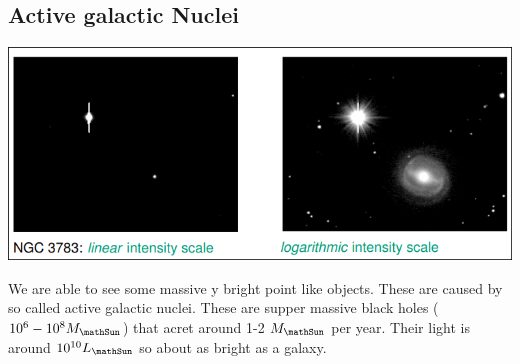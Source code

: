 \documentclass[11pt,a4paper]{article}
\begin{document}
\subsection{Active galactic Nuclei}
\begin{center}
    \includegraphics[width=0.8\linewidth]{screenshot_2024-01-26-145556.png}
\end{center}
We are able to see some massive y bright point like objects.
These are caused by so called active galactic nuclei. These are supper massive black holes ($10^6-10^8 M_\mathSun$) that acret around 1-2 $M_\mathSun$ per year.
Their light is around $10^{10} L_\mathSun$ so about as bright as a galaxy.
\end{document}

